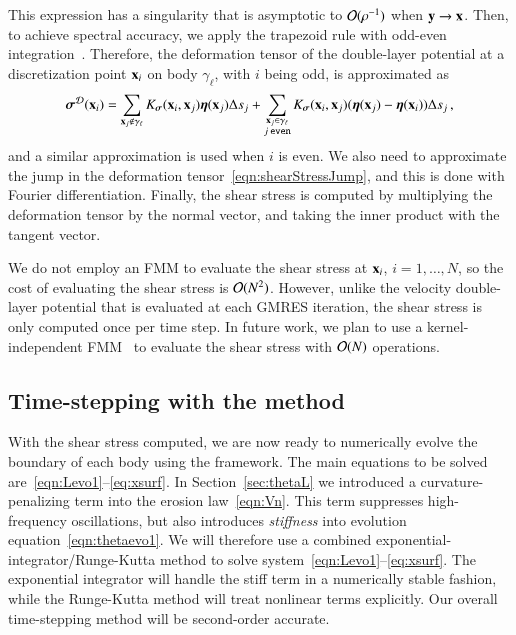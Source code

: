 \documentclass[preprint, 10pt]{elsarticle}
\begin{document}
This expression has a singularity that is asymptotic to ${\mathcal{O}}(\rho^{-1})$ when ${\mathbf{y}} \rightarrow {\mathbf{x}}$.  Then, to achieve spectral accuracy, we apply the trapezoid rule with odd-even integration~\cite{sid-isr1988}.  Therefore, the deformation tensor of the double-layer potential at a discretization point ${\mathbf{x}}_i$ on body $\gamma_\ell$, with $i$ being odd, is approximated as
\begin{align}
  {\boldsymbol\sigma}^{{\mathcal{D}}}({\mathbf{x}}_i) = \sum_{{\mathbf{x}}_j \notin \gamma_\ell}
    K_{\boldsymbol\sigma}({\mathbf{x}}_i,{\mathbf{x}}_j) {\boldsymbol\eta}({\mathbf{x}}_j) \Delta s_j + 
  \sum_{\substack{{\mathbf{x}}_j \in \gamma_\ell \\ j \: \mathtt{even}}}
    K_{\boldsymbol\sigma}({\mathbf{x}}_i,{\mathbf{x}}_j) ({\boldsymbol\eta}({\mathbf{x}}_j) - {\boldsymbol\eta}({\mathbf{x}}_i)) \Delta s_j \, ,
  \label{eqn:stressOddEven}
\end{align}
and a similar approximation is used when $i$ is even.  We also need to approximate the jump in the deformation tensor~\eqref{eqn:shearStressJump}, and this is done with Fourier differentiation.  Finally, the shear stress is computed by multiplying the deformation tensor by the normal vector, and taking the inner product with the tangent vector.

We do not employ an FMM to evaluate the shear stress at ${\mathbf{x}}_i$, $i=1,\ldots,N$, so the cost of evaluating the shear stress is ${\mathcal{O}}(N^2)$.  However, unlike the velocity double-layer potential that is evaluated at each GMRES iteration, the shear stress is only computed once per time step. In future work, we plan to use a kernel-independent FMM~\cite{yin-bir-zor2004} to evaluate the shear stress with ${\mathcal{O}}(N)$ operations.  


\subsection{Time-stepping with the {\thL} method} 
\label{sec:timeStepping}

With the shear stress computed, we are now ready to numerically evolve the boundary of each body using the {\thL} framework. The main equations to be solved are~\eqref{eqn:Levo1}--\eqref{eq:xsurf}.  In Section~\ref{sec:thetaL} we introduced a curvature-penalizing term into the erosion law~\eqref{eqn:Vn}. This term suppresses high-frequency oscillations, but also introduces {\em stiffness} into evolution equation~\eqref{eqn:thetaevo1}. We will therefore use a combined exponential-integrator/Runge-Kutta method to solve system~\eqref{eqn:Levo1}--\eqref{eq:xsurf}. The exponential integrator will handle the stiff term in a numerically stable fashion, while the Runge-Kutta method will treat nonlinear terms explicitly. Our overall time-stepping method will be second-order accurate.
\end{document}

